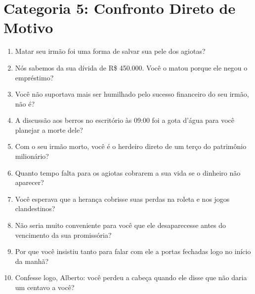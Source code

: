 \section{Categoria 5: Confronto Direto de Motivo}
\begin{enumerate}[noitemsep, topsep=1pt, parsep=0pt]
    \item Matar seu irmão foi uma forma de salvar sua pele dos agiotas?
    \item Nós sabemos da sua dívida de R\$ 450.000. Você o matou porque ele negou o empréstimo?
    \item Você não suportava mais ser humilhado pelo sucesso financeiro do seu irmão, não é?
    \item A discussão aos berros no escritório às 09:00 foi a gota d'água para você planejar a morte dele?
    \item Com o seu irmão morto, você é o herdeiro direto de um terço do patrimônio milionário?
    \item Quanto tempo falta para os agiotas cobrarem a sua vida se o dinheiro não aparecer?
    \item Você esperava que a herança cobrisse suas perdas na roleta e nos jogos clandestinos?
    \item Não seria muito conveniente para você que ele desaparecesse antes do vencimento da sua promissória?
    \item Por que você insistiu tanto para falar com ele a portas fechadas logo no início da manhã?
    \item Confesse logo, Alberto: você perdeu a cabeça quando ele disse que não daria um centavo a você?
\end{enumerate}
